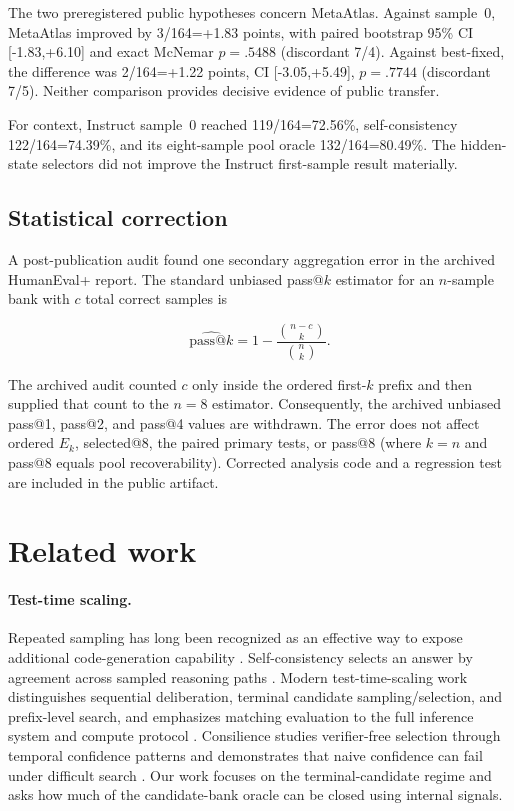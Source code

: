 \documentclass[11pt]{article}
\begin{document}
The two preregistered public hypotheses concern MetaAtlas. Against sample~0, MetaAtlas improved by 3/164=+1.83 points, with paired bootstrap 95\% CI [-1.83,+6.10] and exact McNemar $p=.5488$ (discordant 7/4). Against best-fixed, the difference was 2/164=+1.22 points, CI [-3.05,+5.49], $p=.7744$ (discordant 7/5). Neither comparison provides decisive evidence of public transfer.

For context, Instruct sample~0 reached 119/164=72.56\%, self-consistency 122/164=74.39\%, and its eight-sample pool oracle 132/164=80.49\%. The hidden-state selectors did not improve the Instruct first-sample result materially.

\subsection{Statistical correction}

A post-publication audit found one secondary aggregation error in the archived HumanEval+ report. The standard unbiased pass@$k$ estimator for an $n$-sample bank with $c$ total correct samples is

\begin{equation}
\widehat{\mathrm{pass@}k}=1-\frac{\binom{n-c}{k}}{\binom{n}{k}}.
\end{equation}

The archived audit counted $c$ only inside the ordered first-$k$ prefix and then supplied that count to the $n=8$ estimator. Consequently, the archived unbiased pass@1, pass@2, and pass@4 values are withdrawn. The error does not affect ordered $E_k$, selected@8, the paired primary tests, or pass@8 (where $k=n$ and pass@8 equals pool recoverability). Corrected analysis code and a regression test are included in the public artifact.

\section{Related work}

\paragraph{Test-time scaling.}
Repeated sampling has long been recognized as an effective way to expose additional code-generation capability \cite{chen2021codex}. Self-consistency selects an answer by agreement across sampled reasoning paths \cite{wang2022selfconsistency}. Modern test-time-scaling work distinguishes sequential deliberation, terminal candidate sampling/selection, and prefix-level search, and emphasizes matching evaluation to the full inference system and compute protocol \cite{hariri2026tts}. Consilience studies verifier-free selection through temporal confidence patterns and demonstrates that naive confidence can fail under difficult search \cite{kong2026consilience}. Our work focuses on the terminal-candidate regime and asks how much of the candidate-bank oracle can be closed using internal signals.
\end{document}
